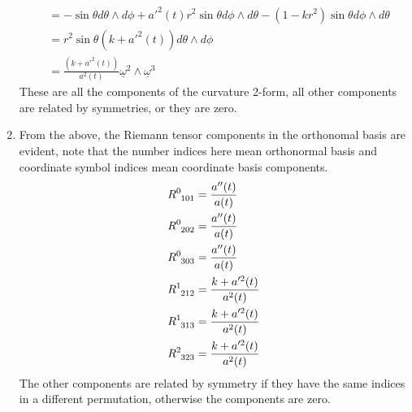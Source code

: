 \documentclass[12pt,a4]{article}
\begin{document}
\begin{enumerate}
\begin{align*}
                                   &= -\sin \theta d \theta \wedge d\phi + a'^2(t) r^2 \sin \theta d \phi \wedge d\theta - \left(1 - k r^2\right)\sin \theta d\phi \wedge d\theta \\
                                   &=  r^2 \sin \theta\left( k + a'^2(t) \right) d\theta \wedge d \phi  \\
                                   &=  \frac{\left( k + a'^2(t) \right)}{a^2(t)} \underline{\omega}^2 \wedge \underline{\omega}^3
    \end{align*}
    These are all the components of the curvature 2-form, all other components are related by symmetries, or they are zero.
  \item
    From the above, the Riemann tensor components in the orthonomal basis are evident, note that the number indices here mean orthonormal basis and coordinate symbol indices mean coordinate basis components.
    \begin{align*}
      \tensor{R}{^0_1_0_1} &= \frac{a''(t)}{a(t)}\\
      \tensor{R}{^0_2_0_2} &= \frac{a''(t)}{a(t)}\\
      \tensor{R}{^0_3_0_3} &= \frac{a''(t)}{a(t)}\\
      \tensor{R}{^1_2_1_2} &= \frac{k + a'^2(t)}{a^2(t)} \\
      \tensor{R}{^1_3_1_3} &= \frac{k + a'^2(t)}{a^2(t)}\\
      \tensor{R}{^2_3_2_3} &= \frac{ k + a'^2(t) }{a^2(t)}
    \end{align*}
    The other components are related by symmetry if they have the same indices in a different permutation, otherwise the components are zero.

\end{enumerate}
\end{document}
